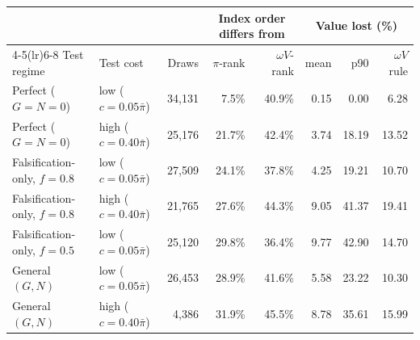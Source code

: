 \begin{tabular}{llrrrrrr}
\toprule
 & & & \multicolumn{2}{c}{Index order differs from} & \multicolumn{3}{c}{Value lost (\%)} \\
\cmidrule(lr){4-5}\cmidrule(lr){6-8}
Test regime & Test cost & Draws & $\pi$-rank & $\omega V$-rank & mean & p90 & $\omega V$ rule \\
\midrule
Perfect ($G=N=0$) & low ($c=0.05\bar{\pi}$) & 34,131 & 7.5\% & 40.9\% & 0.15 & 0.00 & 6.28 \\
Perfect ($G=N=0$) & high ($c=0.40\bar{\pi}$) & 25,176 & 21.7\% & 42.4\% & 3.74 & 18.19 & 13.52 \\
Falsification-only, $f=0.8$ & low ($c=0.05\bar{\pi}$) & 27,509 & 24.1\% & 37.8\% & 4.25 & 19.21 & 10.70 \\
Falsification-only, $f=0.8$ & high ($c=0.40\bar{\pi}$) & 21,765 & 27.6\% & 44.3\% & 9.05 & 41.37 & 19.41 \\
Falsification-only, $f=0.5$ & low ($c=0.05\bar{\pi}$) & 25,120 & 29.8\% & 36.4\% & 9.77 & 42.90 & 14.70 \\
General $(G,N)$ & low ($c=0.05\bar{\pi}$) & 26,453 & 28.9\% & 41.6\% & 5.58 & 23.22 & 10.30 \\
General $(G,N)$ & high ($c=0.40\bar{\pi}$) & 4,386 & 31.9\% & 45.5\% & 8.78 & 35.61 & 15.99 \\
\bottomrule
\end{tabular}
